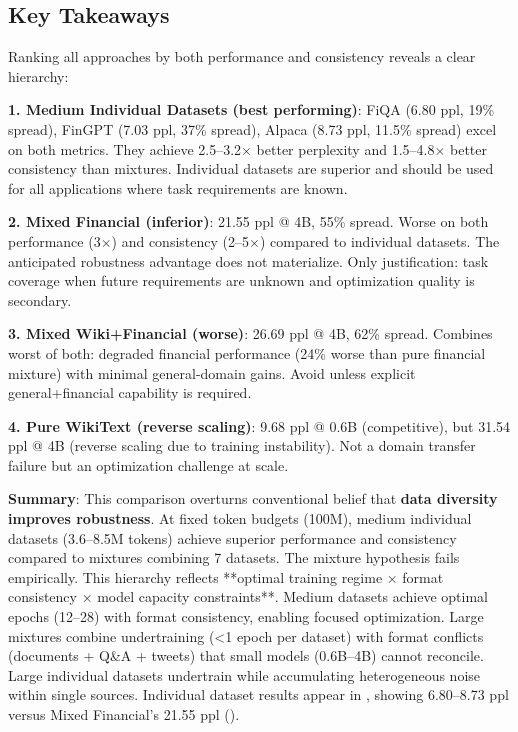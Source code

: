 

\subsection{Key Takeaways}

Ranking all approaches by both performance and consistency reveals a clear hierarchy:

\textbf{1. Medium Individual Datasets (best performing)}: FiQA (6.80 ppl, 19\% spread), FinGPT (7.03 ppl, 37\% spread), Alpaca (8.73 ppl, 11.5\% spread) excel on both metrics. They achieve 2.5–3.2$\times$ better perplexity and 1.5–4.8$\times$ better consistency than mixtures. Individual datasets are superior and should be used for all applications where task requirements are known.

\textbf{2. Mixed Financial (inferior)}: 21.55 ppl @ 4B, 55\% spread. Worse on both performance (3$\times$) and consistency (2–5$\times$) compared to individual datasets. The anticipated robustness advantage does not materialize. Only justification: task coverage when future requirements are unknown and optimization quality is secondary.

\textbf{3. Mixed Wiki+Financial (worse)}: 26.69 ppl @ 4B, 62\% spread. Combines worst of both: degraded financial performance (24\% worse than pure financial mixture) with minimal general-domain gains. Avoid unless explicit general+financial capability is required.

\textbf{4. Pure WikiText (reverse scaling)}: 9.68 ppl @ 0.6B (competitive), but 31.54 ppl @ 4B (reverse scaling due to training instability). Not a domain transfer failure but an optimization challenge at scale.

\textbf{Summary}: This comparison overturns conventional belief that \textbf{data diversity improves robustness}. At fixed token budgets (100M), medium individual datasets (3.6–8.5M tokens) achieve superior performance and consistency compared to mixtures combining 7 datasets. The mixture hypothesis fails empirically. This hierarchy reflects **optimal training regime × format consistency × model capacity constraints**. Medium datasets achieve optimal epochs (12–28) with format consistency, enabling focused optimization. Large mixtures combine undertraining (<1 epoch per dataset) with format conflicts (documents + Q\&A + tweets) that small models (0.6B–4B) cannot reconcile. Large individual datasets undertrain while accumulating heterogeneous noise within single sources. Individual dataset results appear in , showing 6.80–8.73 ppl versus Mixed Financial's 21.55 ppl ().

